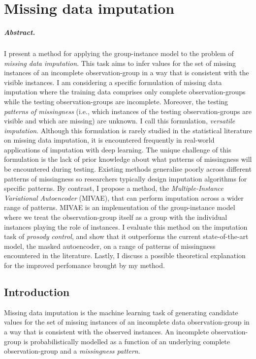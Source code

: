 \documentclass[../thesis.tex]{subfiles}
\begin{document}
\chapter{Missing data imputation}

\paragraph{Abstract.} I present a method for applying the group-instance model to the problem of \textit{missing data imputation}. This task aims to infer values for the set of missing instances of an incomplete observation-group in a way that is consistent with the visible instances. I am considering a specific formulation of missing data imputation where the training data comprises only complete observation-groups while the testing observation-groups are incomplete. Moreover, the testing \textit{patterns of missingness} (i.e., which instances of the testing observation-groups are visible and which are missing) are unknown. I call this formulation, \textit{versatile imputation}. Although this formulation is rarely studied in the statistical literature on missing data imputation, it is encountered frequently in real-world applications of imputation with deep learning. The unique challenge of this formulation is the lack of prior knowledge about what patterns of missingness will be encountered during testing. Existing methods generalise poorly across different patterns of missingness so researchers typically design imputation algorithms for specific patterns. By contrast, I propose a method, the \textit{Multiple-Instance Variational Autoencoder} (MIVAE), that can perform imputation across a wider range of patterns. MIVAE is an implementation of the group-instance model where we treat the observation-group itself as a group with the individual instances playing the role of instances. I evaluate this method on the imputation task of \textit{prosody control}, and show that it outperforms the current state-of-the-art model, the masked autoencoder, on a range of patterns of missingness encountered in the literature. Lastly, I discuss a possible theoretical explanation for the improved perfomance brought by my method.

\section{Introduction}

Missing data imputation is the machine learning task of generating candidate values for the set of missing instances of an incomplete data observation-group in a way that is consistent with the observed instances. An incomplete observation-group is probabilistically modelled as a function of an underlying complete observation-group and a \textit{missingness pattern}. 
\end{document}
